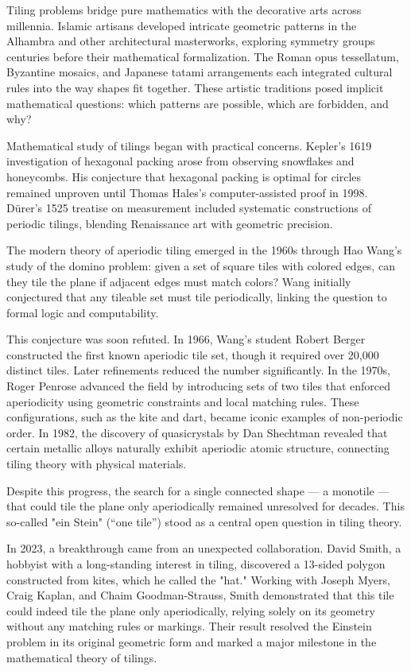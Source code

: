 \begin{historical}
Tiling problems bridge pure mathematics with the decorative arts across millennia. Islamic artisans developed intricate geometric patterns in the Alhambra and other architectural masterworks, exploring symmetry groups centuries before their mathematical formalization. The Roman opus tessellatum, Byzantine mosaics, and Japanese tatami arrangements each integrated cultural rules into the way shapes fit together. These artistic traditions posed implicit mathematical questions: which patterns are possible, which are forbidden, and why?

Mathematical study of tilings began with practical concerns. Kepler's 1619 investigation of hexagonal packing arose from observing snowflakes and honeycombs. His conjecture that hexagonal packing is optimal for circles remained unproven until Thomas Hales's computer-assisted proof in 1998. Dürer's 1525 treatise on measurement included systematic constructions of periodic tilings, blending Renaissance art with geometric precision.

The modern theory of aperiodic tiling emerged in the 1960s through Hao Wang's study of the domino problem: given a set of square tiles with colored edges, can they tile the plane if adjacent edges must match colors? Wang initially conjectured that any tileable set must tile periodically, linking the question to formal logic and computability.

This conjecture was soon refuted. In 1966, Wang’s student Robert Berger constructed the first known aperiodic tile set, though it required over 20,000 distinct tiles. Later refinements reduced the number significantly. In the 1970s, Roger Penrose advanced the field by introducing sets of two tiles that enforced aperiodicity using geometric constraints and local matching rules. These configurations, such as the kite and dart, became iconic examples of non-periodic order. In 1982, the discovery of quasicrystals by Dan Shechtman revealed that certain metallic alloys naturally exhibit aperiodic atomic structure, connecting tiling theory with physical materials.

Despite this progress, the search for a single connected shape — a monotile — that could tile the plane only aperiodically remained unresolved for decades. This so-called "ein Stein"  (“one tile”) stood as a central open question in tiling theory.

In 2023, a breakthrough came from an unexpected collaboration. David Smith, a hobbyist with a long-standing interest in tiling, discovered a 13-sided polygon constructed from kites, which he called the "hat." Working with Joseph Myers, Craig Kaplan, and Chaim Goodman-Strauss, Smith demonstrated that this tile could indeed tile the plane only aperiodically, relying solely on its geometry without any matching rules or markings. Their result resolved the Einstein problem in its original geometric form and marked a major milestone in the mathematical theory of tilings.
\end{historical}

